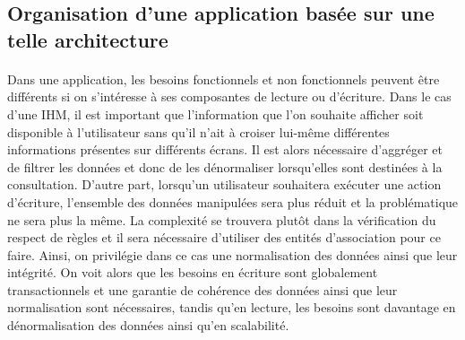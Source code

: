 \subsection{Organisation d'une application basée sur une telle architecture}
\paragraph{}
Dans une application, les besoins fonctionnels et non fonctionnels peuvent être différents si on s'intéresse à ses composantes de lecture ou d'écriture.
Dans le cas d'une IHM, il est important que l'information que l'on souhaite afficher soit disponible à l'utilisateur sans qu'il n'ait à croiser lui-même différentes informations présentes sur différents écrans.
Il est alors nécessaire d'aggréger et de filtrer les données et donc de les dénormaliser lorsqu'elles sont destinées à la consultation.
D'autre part, lorsqu'un utilisateur souhaitera exécuter une action d'écriture, l'ensemble des données manipulées sera plus réduit et la problématique ne sera plus la même.
La complexité se trouvera plutôt dans la vérification du respect de règles et il sera nécessaire d'utiliser des entités d'association pour ce faire.
Ainsi, on privilégie dans ce cas une normalisation des données ainsi que leur intégrité.
On voit alors que les besoins en écriture sont globalement transactionnels et une garantie de cohérence des données ainsi que leur normalisation sont nécessaires, tandis qu'en lecture, les besoins sont davantage en dénormalisation des données ainsi qu'en scalabilité.
